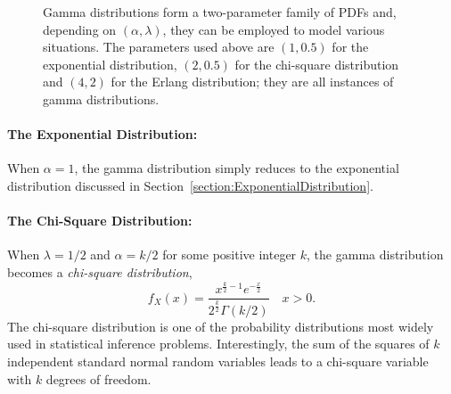 \begin{figure}[ht]
\begin{center}
\end{center}
\caption{Gamma distributions form a two-parameter family of PDFs and, depending on $(\alpha, \lambda)$, they can be employed to model various situations.
The parameters used above are $(1, 0.5)$ for the exponential distribution, $(2, 0.5)$ for the chi-square distribution and $(4, 2)$ for the Erlang distribution;
they are all instances of gamma distributions.}
\label{figure:GammaDistribution}
\end{figure}

\paragraph{The Exponential Distribution:}
When $\alpha = 1$, the gamma distribution simply reduces to the exponential distribution discussed in Section~\ref{section:ExponentialDistribution}.

\paragraph{The Chi-Square Distribution:}
When $\lambda = 1/2$ and $\alpha = k/2$ for some positive integer $k$, the gamma distribution becomes a \emph{chi-square distribution},
\begin{equation*}
f_X (x) = \frac{x^{\frac{k}{2} - 1} e^{-\frac{x}{2}}}{2^{\frac{k}{2}}\Gamma (k/2)} \quad  x > 0.
\end{equation*}
The chi-square distribution is one of the probability distributions most widely used in statistical inference problems.
Interestingly, the sum of the squares of $k$ independent standard normal random variables leads to a chi-square variable with $k$ degrees of freedom.


